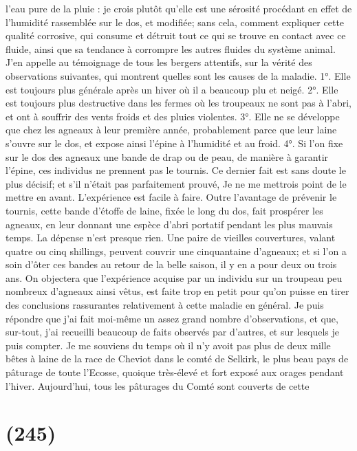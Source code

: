 l'eau pure de la pluie : je crois plutôt qu'elle est une sérosité procédant en effet de l'humidité rassemblée sur le dos, et modifiée; sans cela, comment expliquer cette qualité corrosive, qui consume et détruit tout ce qui se trouve en contact avec ce fluide, ainsi que sa tendance à corrompre les autres fluides du système animal.
J'en appelle au témoignage de tous les bergers attentifs, sur la vérité des observations suivantes, qui montrent quelles sont les causes de la maladie.
1°. Elle est toujours plus générale après un hiver où il a beaucoup plu et neigé.
2°. Elle est toujours plus destructive dans les fermes où les troupeaux ne sont pas à l'abri, et ont à souffrir des vents froids et des pluies violentes.
3°. Elle ne se développe que chez les agneaux à leur première année, probablement parce que leur laine s'ouvre sur le dos, et expose ainsi l'épine à l'humidité et au froid.
4°. Si l'on fixe sur le dos des agneaux une bande de drap ou de peau, de manière à garantir l'épine, ces individus ne prennent pas le tournis.
Ce dernier fait est sans doute le plus décisif; et s'il n'était pas parfaitement prouvé,\setcounter{page}{244} Je ne me mettrois point de le mettre en avant. L'expérience est facile à faire. Outre l'avantage de prévenir le tournis, cette bande d'étoffe de laine, fixée le long du dos, fait prospérer les agneaux, en leur donnant une espèce d'abri portatif pendant les plus mauvais temps. La dépense n'est presque rien. Une paire de vieilles couvertures, valant quatre ou cinq shillings, peuvent couvrir une cinquantaine d'agneaux; et si l'on a soin d'ôter ces bandes au retour de la belle saison, il y en a pour deux ou trois ans.
On objectera que l'expérience acquise par un individu sur un troupeau peu nombreux d'agneaux ainsi vêtus, est faite trop en petit pour qu'on puisse en tirer des conclusions rassurantes relativement à cette maladie en général. Je puis répondre que j'ai fait moi-même un assez grand nombre d'observations, et que, sur-tout, j'ai recueilli beaucoup de faits observés par d'autres, et sur lesquels je puis compter.
Je me souviens du temps où il n'y avoit pas plus de deux mille bêtes à laine de la race de Cheviot dans le comté de Selkirk, le plus beau pays de pâturage de toute l'Ecosse, quoique très-élevé et fort exposé aux orages pendant l'hiver. Aujourd'hui, tous les pâturages du Comté sont couverts de cette\setcounter{page}{245} \section{(245)}
